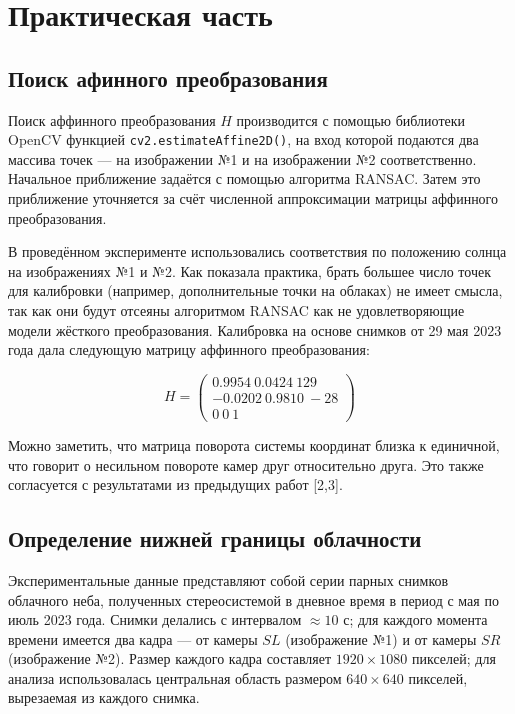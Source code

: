 \documentclass[11pt]{article} %
\begin{document}
	\pagebreak
	
	\section{Практическая часть}
\subsection{Поиск афинного преобразования}
\vspace{3mm}\hspace{5mm}

Поиск аффинного преобразования $H$ производится с помощью библиотеки OpenCV
функцией \texttt{cv2.estimateAffine2D()}, на вход которой подаются два массива точек — на изображении №1 и на изображении №2 соответственно. Начальное приближение задаётся с помощью
алгоритма RANSAC. Затем это приближение уточняется за счёт численной аппроксимации матрицы аффинного преобразования.\par
В проведённом эксперименте использовались соответствия по положению солнца на изображениях №1 и №2. Как показала практика, брать большее число точек для калибровки (например, дополнительные точки на облаках) не имеет смысла, так
как они будут отсеяны алгоритмом RANSAC как не удовлетворяющие модели жёсткого преобразования. Калибровка на основе снимков от 29 мая 2023 года дала следующую матрицу аффинного преобразования:

\begin{equation}
	H = \begin{pmatrix} 0.9954\ 0.0424 \ 129 \\ -0.0202 \ 0.9810 \ -28 \\0 \ 0 \ 1 \end{pmatrix}
\end{equation}

Можно заметить, что матрица поворота системы координат близка к единичной, что говорит о несильном повороте камер друг относительно друга. Это также
согласуется с результатами из предыдущих работ [2,3].

\subsection{Определение нижней границы облачности}
\vspace{3mm}\hspace{5mm}

Экспериментальные данные представляют собой серии парных снимков облачного неба, полученных стереосистемой в дневное время в период с мая по июль 2023 года. Снимки делались с интервалом $\approx 10$ с; для каждого момента времени имеется два кадра — от камеры $SL$ (изображение №1) и от камеры $SR$ (изображение №2). Размер каждого кадра составляет $1920 \times 1080$ пикселей; для анализа использовалась центральная область размером $640 \times 640$ пикселей, вырезаемая из каждого снимка.
\end{document}
